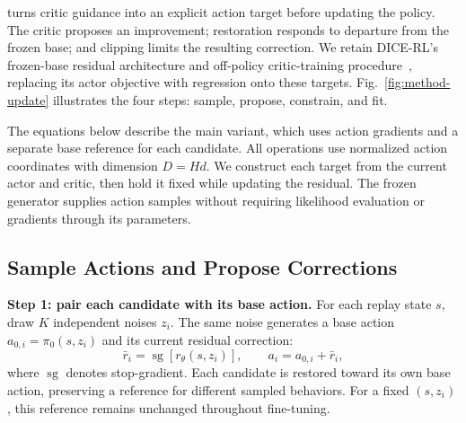 
\method{} turns critic guidance into an explicit action target before
updating the policy. The critic proposes an improvement; restoration responds to departure
from the frozen base; and clipping limits the resulting correction. We retain DICE-RL's
frozen-base residual architecture and off-policy critic-training
procedure~\cite{dicerl2026}, replacing its actor objective with regression
onto these targets. Fig.~\ref{fig:method-update} illustrates the four steps:
sample, propose, constrain, and fit.

The equations below describe the main variant, which uses action gradients
and a separate base reference for each candidate. All operations use
normalized action coordinates with dimension $D=Hd$. We construct each
target from the current actor and critic, then hold it fixed while updating
the residual. The frozen generator supplies action samples without
requiring likelihood evaluation or gradients through its parameters.



\subsection{Sample Actions and Propose Corrections}
\label{sec:reward-field}

\textbf{Step 1: pair each candidate with its base action.}
For each replay state $s$, draw $K$ independent noises $z_i$. The same
noise generates a base action $a_{0,i}=\pi_0(s,z_i)$ and its current
residual correction:
\begin{equation}
  \bar r_i=\operatorname{sg}[r_\theta(s,z_i)],
  \qquad a_i=a_{0,i}+\bar r_i,
  \label{eq:candidates}
\end{equation}
where $\operatorname{sg}$ denotes stop-gradient. Each candidate is restored
toward its own base action, preserving a reference for different sampled
behaviors. For a fixed $(s,z_i)$, this reference remains unchanged
throughout fine-tuning.

